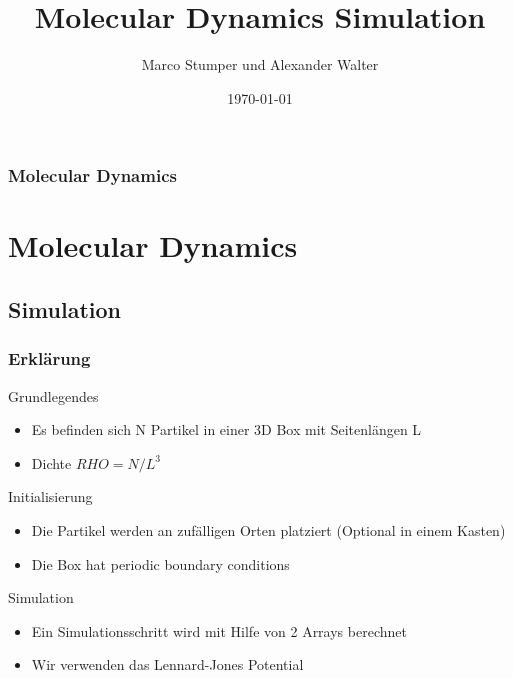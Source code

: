 \documentclass[11pt]{beamer}
\author{Marco Stumper und Alexander Walter}
\title{Molecular Dynamics Simulation}
\institute{Universität Hamburg}
\date{\today} %
\begin{document}
\begin{frame}[plain]
  \titlepage
\end{frame}

\begin{frame}
  \begin{minipage}{0.50\textwidth}
	\frametitle{Molecular Dynamics}
	\tableofcontents
  \end{minipage}
  \begin{minipage}{0.45\textwidth}
  \hspace*{-1.3cm}
  \end{minipage}
\end{frame}


\section{Molecular Dynamics}

\subsection{Simulation}

\begin{frame}
  \frametitle{Erklärung}
  \vspace*{-0.3cm}
  \begin{block}{Grundlegendes}
    \begin{itemize}
      \item Es befinden sich N Partikel in einer 3D Box mit Seitenlängen L
      \item Dichte ${RHO = N/L^3}$
      \end{itemize}
  \end{block}
  \pause
  \begin{block}{Initialisierung}
    \begin{itemize}
      \item Die Partikel werden an zufälligen Orten platziert (Optional in einem Kasten)
      \item Die Box hat periodic boundary conditions %
    \end{itemize}
  \end{block}
  \pause
  \begin{block}{Simulation}
    \begin{itemize}
      \item Ein Simulationsschritt wird mit Hilfe von 2 Arrays berechnet
      \item Wir verwenden das Lennard-Jones Potential
    \end{itemize}
  \end{block}
\end{frame}
\end{document}
